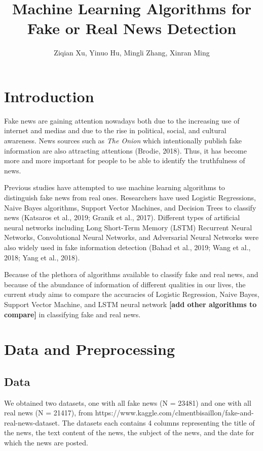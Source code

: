 \documentclass{article}
\title{Machine Learning Algorithms for Fake or Real News Detection}
\author{Ziqian Xu, Yinuo Hu, Mingli Zhang, Xinran Ming}
\date{}
\begin{document}
\maketitle


\begin{multicols}{2}
\section{Introduction}

Fake news are gaining attention nowadays both due to the increasing use of internet and medias and due to the rise in political, social, and cultural awareness. News sources such as \emph{The Onion} which intentionally publish fake information are also attracting attentions (Brodie, 2018). Thus, it has become more and more important for people to be able to identify the truthfulness of news.\par
Previous studies have attempted to use machine learning algorithms to distinguish fake news from real ones. Researchers have used Logistic Regressions, Naive Bayes algorithms, Support Vector Machines, and Decision Trees to classify news (Katsaros et al., 2019; Granik et al., 2017). Different types of artificial neural networks including Long Short-Term Memory (LSTM) Recurrent Neural Networks, Convolutional Neural Networks, and Adversarial Neural Networks were also widely used in fake information detection (Bahad et al., 2019; Wang et al., 2018; Yang et al., 2018). \par
Because of the plethora of algorithms available to classify fake and real news, and because of the abundance of information of different qualities in our lives, the current study aims to compare the accuracies of Logistic Regression, Naive Bayes, Support Vector Machine, and LSTM neural network \textbf{[add other algorithms to compare]} in classifying fake and real news. 


\section{Data and Preprocessing}

\subsection{Data}
We obtained two datasets, one with all fake news (N = 23481) and one with all real news (N = 21417), from https://www.kaggle.com/clmentbisaillon/fake-and-real-news-dataset. The datasets each contains 4 columns representing the title of the news, the text content of the news, the subject of the news, and the date for which the news are posted. 


\end{multicols}
\end{document}
